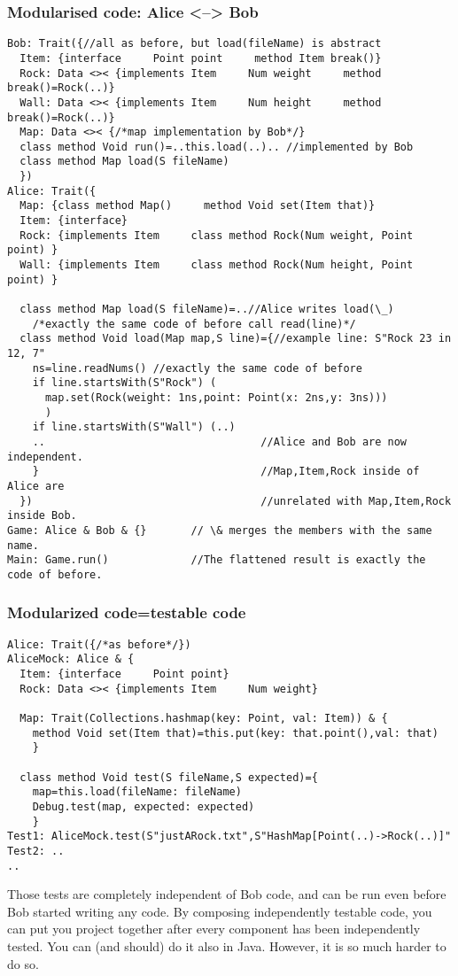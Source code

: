 \begin{frame}[fragile]
\frametitle{Modularised code: Alice <--> Bob}
\begin{NiceCode}{59ex}{0.7}
\begin{lstlisting}
Bob: Trait({//all as before, but load(fileName) is abstract
  Item: {interface     Point point     method Item break()}
  Rock: Data <>< {implements Item     Num weight     method break()=Rock(..)}
  Wall: Data <>< {implements Item     Num height     method break()=Rock(..)}
  Map: Data <>< {/*map implementation by Bob*/}
  class method Void run()=..this.load(..).. //implemented by Bob
  class method Map load(S fileName)
  })
Alice: Trait({
  Map: {class method Map()     method Void set(Item that)}
  Item: {interface}
  Rock: {implements Item     class method Rock(Num weight, Point point) }
  Wall: {implements Item     class method Rock(Num height, Point point) }

  class method Map load(S fileName)=..//Alice writes load(\_)
    /*exactly the same code of before call read(line)*/
  class method Void load(Map map,S line)={//example line: S"Rock 23 in 12, 7"
    ns=line.readNums() //exactly the same code of before
    if line.startsWith(S"Rock") (
      map.set(Rock(weight: 1ns,point: Point(x: 2ns,y: 3ns)))
      )
    if line.startsWith(S"Wall") (..)
    ..                                  //Alice and Bob are now independent.
    }                                   //Map,Item,Rock inside of Alice are
  })                                    //unrelated with Map,Item,Rock inside Bob.
Game: Alice & Bob & {}       // \& merges the members with the same name.
Main: Game.run()             //The flattened result is exactly the code of before.
\end{lstlisting}
\end{NiceCode}
\end{frame}

\begin{frame}[fragile]
\frametitle{Modularized code=testable code}
\begin{NiceCode}{59ex}{0.7}
\begin{lstlisting}
Alice: Trait({/*as before*/})
AliceMock: Alice & {
  Item: {interface     Point point}
  Rock: Data <>< {implements Item     Num weight}

  Map: Trait(Collections.hashmap(key: Point, val: Item)) & {
    method Void set(Item that)=this.put(key: that.point(),val: that)
    }

  class method Void test(S fileName,S expected)={
    map=this.load(fileName: fileName)
    Debug.test(map, expected: expected)
    }
Test1: AliceMock.test(S"justARock.txt",S"HashMap[Point(..)->Rock(..)]"
Test2: ..
..
\end{lstlisting}
\end{NiceCode}
Those tests are completely independent of Bob code, and can be run even before
Bob started writing any code.
By composing independently testable code, you can put you project together
after every component has been independently tested.
You can (and should) do it also in Java.
However, it is so much harder to do so.
\end{frame}


